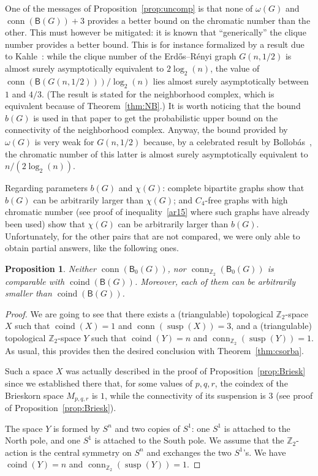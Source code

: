 \documentclass[12pt]{amsart}
\newtheorem{proposition}[theorem]{Proposition}
\theoremstyle{definition}
\def\Z{\mathbb{Z}}
\def\B{\mathsf{B}}
\def\susp{\operatorname{susp}}
\def\conn{\operatorname{conn}}
\def\coind{\operatorname{coind}}
\begin{document}
One of the messages of Proposition~\ref{prop:uncomp} is that none of $\omega(G)$ and $\conn(\B(G))+3$ provides a better bound on the chromatic number than the other. This must however be mitigated: it is known that ``generically'' the clique number provides a better bound. This is for instance formalized by a result due to Kahle~\cite{kahle2007neighborhood}: 
while the clique number of the Erd\H{o}s--R\'enyi graph $G(n,1/2)$ is almost surely asymptotically equivalent to $2\log_2(n)$, the value of $\conn(\B(G(n,1/2)))/\log_2(n)$ lies almost surely asymptotically between $1$ and $4/3$. (The result is stated for the neighborhood complex, which is equivalent because of Theorem~\ref{thm:NB}.) It is worth noticing that the bound $b(G)$ is used in that paper to get the probabilistic upper bound on the connectivity of the neighborhood complex. Anyway, the bound provided by $\omega(G)$ is very weak for $G(n,1/2)$ because, by a celebrated result by Bollob\'as~\cite{bollobas1988chromatic}, the chromatic number of this latter is almost surely asymptotically equivalent to $n/(2\log_2(n))$.


Regarding parameters $b(G)$ and $\chi(G)$: complete bipartite graphs show that $b(G)$ can be arbitrarily larger than $\chi(G)$; and $C_4$-free graphs with high chromatic number (see proof of inequality~\eqref{ar15} where such graphs have already been used) show that $\chi(G)$ can be arbitrarily larger than $b(G)$. Unfortunately, for the other pairs that are not compared, we were only able to obtain partial answers, like the following ones.

\begin{proposition}\label{prop:conn-coind}
Neither $\conn(\B_0(G))$, nor $\conn_{\Z_2}(\B_0(G))$ is comparable with $\coind(\B(G))$. Moreover, each of them can be 
arbitrarily smaller than $\coind(\B(G))$.
\end{proposition}

\begin{proof}
We are going to see that there exists a (triangulable) topological $\Z_2$-space $X$ such that $\coind(X)=1$ and $\conn(\susp(X)) = 3$, and a (triangulable) topological $\Z_2$-space $Y$ such that $\coind(Y)= n$ and $\conn_{\Z_2} (\susp(Y)) = 1$. As usual, this provides then the desired conclusion with Theorem~\ref{thm:csorba}.

Such a space $X$ was actually described in the proof of Proposition~\ref{prop:Briesk} since we established there that, for some values of $p,q,r$, the coindex of the Brieskorn space $M_{p,q,r}$ is $1$, while the connectivity of its suspension is $3$ (see proof of Proposition~\ref{prop:Briesk}).

The space $Y$ is formed by $S^n$ and two copies of $S^1$: one $S^1$ is attached to the North pole, and one $S^1$ is attached to the South pole. We assume that the $\Z_2$-action is the central symmetry on $S^n$ and exchanges the two $S^1$'s. We have $\coind(Y)= n$ and $\conn_{\Z_2} (\susp(Y)) = 1$.
\end{proof}
\end{document}

